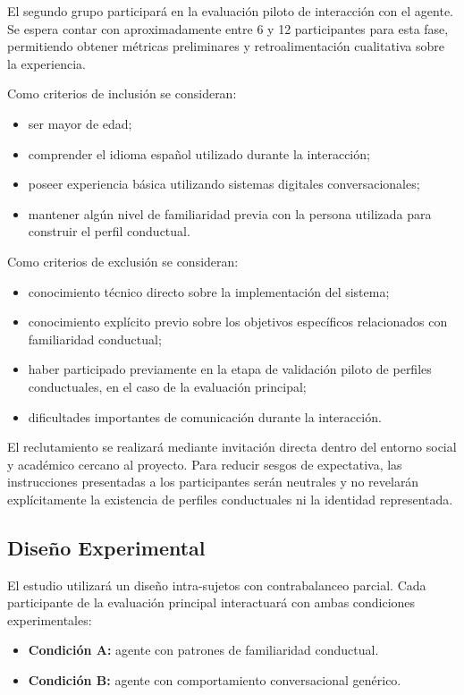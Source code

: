 \documentclass[12pt]{article}
\begin{document}
El segundo grupo participará en la evaluación piloto de interacción con el agente. Se espera contar con aproximadamente entre 6 y 12 participantes para esta fase, permitiendo obtener métricas preliminares y retroalimentación cualitativa sobre la experiencia.

Como criterios de inclusión se consideran:

\begin{itemize}
    \item ser mayor de edad;
    \item comprender el idioma español utilizado durante la interacción;
    \item poseer experiencia básica utilizando sistemas digitales conversacionales;
    \item mantener algún nivel de familiaridad previa con la persona utilizada para construir el perfil conductual.
\end{itemize}

Como criterios de exclusión se consideran:

\begin{itemize}
    \item conocimiento técnico directo sobre la implementación del sistema;
    \item conocimiento explícito previo sobre los objetivos específicos relacionados con familiaridad conductual;
    \item haber participado previamente en la etapa de validación piloto de perfiles conductuales, en el caso de la evaluación principal;
    \item dificultades importantes de comunicación durante la interacción.
\end{itemize}

El reclutamiento se realizará mediante invitación directa dentro del entorno social y académico cercano al proyecto. Para reducir sesgos de expectativa, las instrucciones presentadas a los participantes serán neutrales y no revelarán explícitamente la existencia de perfiles conductuales ni la identidad representada.

\subsection{Diseño Experimental}

El estudio utilizará un diseño intra-sujetos con contrabalanceo parcial. Cada participante de la evaluación principal interactuará con ambas condiciones experimentales:

\begin{itemize}
    \item \textbf{Condición A:} agente con patrones de familiaridad conductual.
    \item \textbf{Condición B:} agente con comportamiento conversacional genérico.
\end{itemize}
\end{document}
